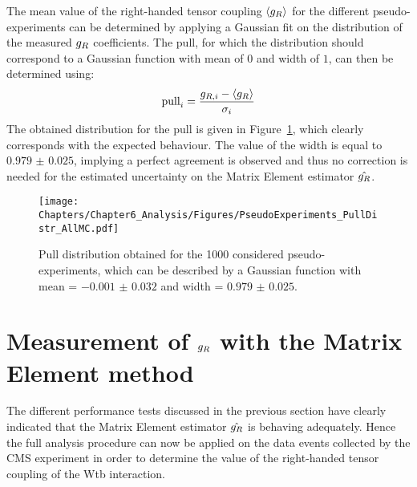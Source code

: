 The mean value of the right-handed tensor coupling $\left\langle g_{R} \right\rangle$ for the different pseudo-experiments can be determined by applying a Gaussian fit on the distribution of the measured $g_{R}$ coefficients.
%
The pull, for which the distribution should correspond to a Gaussian function with mean of $0$ and width of $1$, can then be determined using:
\begin{equation}
 \textrm{pull}_{i} = \frac{g_{R,i} - \left\langle g_{R} \right\rangle}{\sigma_{i}}
\end{equation}
The obtained distribution for the pull is given in Figure~\ref{fig::PullDistr}, which clearly corresponds with the expected behaviour.
The value of the width is equal to $0.979$ $\pm$ $0.025$, implying a perfect agreement is observed and thus no correction is needed for the estimated uncertainty on the Matrix Element estimator $\hat{g_{R}}$.
\begin{figure}[h!t]
 \centering
 \texttt{[image: Chapters/Chapter6\_Analysis/Figures/PseudoExperiments\_PullDistr\_AllMC.pdf]}
 \caption{Pull distribution obtained for the 1000 considered pseudo-experiments, which can be described by a Gaussian function with mean = $-0.001$ $\pm$ $0.032$ and width = $0.979$ $\pm$ $0.025$.} \label{fig::PullDistr}
\end{figure}

\section{Measurement of $g_{R}$ with the Matrix Element method} \label{sec::gRMeas}

The different performance tests discussed in the previous section have clearly indicated that the Matrix Element estimator $\hat{g_{R}}$ is behaving adequately.
Hence the full analysis procedure can now be applied on the data events collected by the CMS experiment in order to determine the value of the right-handed tensor coupling of the Wtb interaction.

